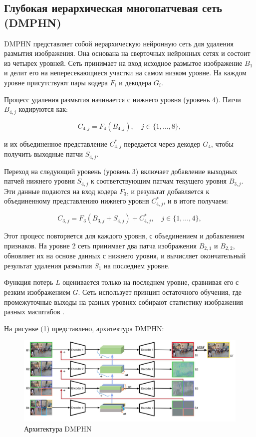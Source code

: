 \subsection{Глубокая иерархическая многопатчевая сеть (DMPHN)}

DMPHN представляет собой иерархическую нейронную сеть для удаления размытия изображения. Она основана на сверточных нейронных сетях и состоит из четырех уровней. Сеть принимает на вход исходное размытое изображение \(B_1\) и делит его на непересекающиеся участки на самом низком уровне. На каждом уровне присутствуют пары кодера \(F_i\) и декодера \(G_i\).

Процесс удаления размытия начинается с нижнего уровня (уровень 4). Патчи \(B_{4,j}\) кодируются как:

\begin{equation}
	C_{4,j} = F_{4}(B_{4,j}), \quad j \in \{1, \dots, 8\},
\end{equation}

и их объединенное представление \(C_{4,j}^{\ast}\) передается через декодер \(G_{4}\), чтобы получить выходные патчи \(S_{4,j}\).

Переход на следующий уровень (уровень 3) включает добавление выходных патчей нижнего уровня \(S_{4,j}\) к соответствующим патчам текущего уровня \(B_{3,j}\). Эти данные подаются на вход кодера \(F_{3}\), и результат добавляется к объединенному представлению нижнего уровня \(C_{4,j}^{\ast}\), и в итоге получаем:

\begin{equation}
	C_{3,j} = F_{3}(B_{3,j} + S_{4,j}) + C_{4,j}^{\ast}, \quad j \in \{1, \dots, 4\},
\end{equation}

Этот процесс повторяется для каждого уровня, с объединением и добавлением признаков. На уровне 2 сеть принимает два патча изображения \(B_{2,1}\) и \(B_{2,2}\), обновляет их на основе данных с нижнего уровня, и вычисляет окончательный результат удаления размытия \(S_{1}\) на последнем уровне.

Функция потерь \(L\) оценивается только на последнем уровне, сравнивая его с резким изображением \(G\). Сеть использует принцип остаточного обучения, где промежуточные выходы на разных уровнях собирают статистику изображения разных масштабов \cite{zhang2019deep}.

На рисунке (\ref{fig:dmphn}) представлено, архитектура DMPHN: 
\begin{figure}[H]
	\centering
	\includegraphics[width=0.8\linewidth]{assets/DMPHN.png}
	\caption{Архитектура DMPHN}
	\label{fig:dmphn}
\end{figure}


